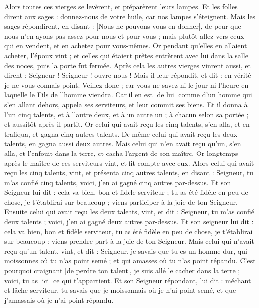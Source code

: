 \begin{multicols}{2}
Alors toutes ces vierges se levèrent, et préparèrent leurs lampes.
Et les folles dirent aux sages : donnez-nous de votre huile, car nos lampes s'éteignent.
Mais les sages répondirent, en disant : [Nous ne pouvons vous en donner], de peur que nous n'en ayons pas assez pour nous et pour vous ; mais plutôt allez vers ceux qui en vendent, et en achetez pour vous-mêmes.
Or pendant qu'elles en allaient acheter, l'époux vint ; et celles qui étaient prêtes entrèrent avec lui dans la salle des noces, puis la porte fut fermée.
Après cela les autres vierges vinrent aussi, et dirent : Seigneur ! Seigneur ! ouvre-nous !
Mais il leur répondit, et dit : en vérité je ne vous connais point.
Veillez donc ; car vous ne savez ni le jour ni l'heure en laquelle le Fils de l'homme viendra.
Car il en est [de lui] comme d'un homme qui s'en allant dehors, appela ses serviteurs, et leur commit ses biens.
Et il donna à l'un cinq talents, et à l'autre deux, et à un autre un ; à chacun selon sa portée ; et aussitôt après il partit.
Or celui qui avait reçu les cinq talents, s'en alla, et en trafiqua, et gagna cinq autres talents.
De même celui qui avait reçu les deux talents, en gagna aussi deux autres.
Mais celui qui n'en avait reçu qu'un, s'en alla, et l'enfouit dans la terre, et cacha l'argent de son maître.
Or longtemps après le maître de ces serviteurs vint, et fit compte avec eux.
Alors celui qui avait reçu les cinq talents, vint, et présenta cinq autres talents, en disant : Seigneur, tu m'as confié cinq talents, voici, j'en ai gagné cinq autres par-dessus.
Et son Seigneur lui dit : cela va bien, bon et fidèle serviteur ; tu as été fidèle en peu de chose, je t'établirai sur beaucoup ; viens participer à la joie de ton Seigneur.
Ensuite celui qui avait reçu les deux talents, vint, et dit : Seigneur, tu m'as confié deux talents ; voici, j'en ai gagné deux autres par-dessus.
Et son seigneur lui dit : cela va bien, bon et fidèle serviteur, tu as été fidèle en peu de chose, je t'établirai sur beaucoup : viens prendre part à la joie de ton Seigneur.
Mais celui qui n'avait reçu qu'un talent, vint, et dit : Seigneur, je savais que tu es un homme dur, qui moissonnes où tu n'as point semé ; et qui amasses où tu n'as point répandu.
C'est pourquoi craignant [de perdre ton talent], je suis allé le cacher dans la terre ; voici, tu as [ici] ce qui t'appartient.
Et son Seigneur répondant, lui dit : méchant et lâche serviteur, tu savais que je moissonnais où je n'ai point semé, et que j'amassais où je n'ai point répandu.

\end{multicols}
